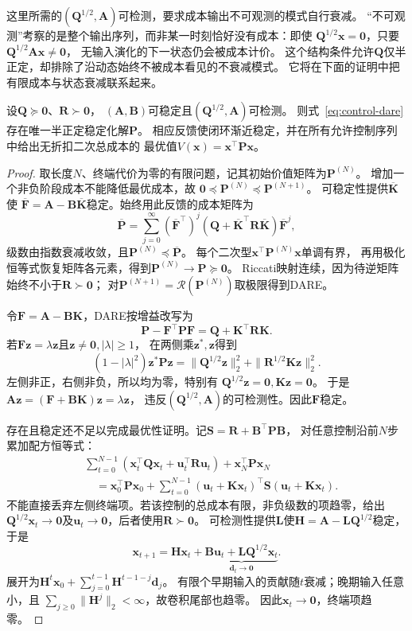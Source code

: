 这里所需的$(\bm Q^{1/2},\bm A)$可检测，要求成本输出不可观测的模式自行衰减。
“不可观测”考察的是整个输出序列，而非某一时刻恰好没有成本：即使
$\bm Q^{1/2}\bm x=\bm0$，只要$\bm Q^{1/2}\bm A\bm x\neq\bm0$，
无输入演化的下一状态仍会被成本计价。
这个结构条件允许$\bm Q$仅半正定，却排除了沿动态始终不被成本看见的不衰减模式。
它将在下面的证明中把有限成本与状态衰减联系起来。

\begin{theorem}[无限时域LQR的稳定化解]
\label{thm:control-infinite-horizon-lqr}
设$\bm Q\succeq\bm0$、$\bm R\succ\bm0$，
$(\bm A,\bm B)$可稳定且$(\bm Q^{1/2},\bm A)$可检测。
则式~\eqref{eq:control-dare}存在唯一半正定稳定化解$\bm P$。
相应反馈使闭环渐近稳定，并在所有允许控制序列中给出无折扣二次总成本的
最优值$V(\bm x)=\bm x^\top\bm P\bm x$。
\end{theorem}
\begin{proof}
取长度$N$、终端代价为零的有限问题，记其初始价值矩阵为$\bm P^{(N)}$。
增加一个非负阶段成本不能降低最优成本，故
$\bm0\preceq\bm P^{(N)}\preceq\bm P^{(N+1)}$。
可稳定性提供$\overline{\bm K}$使
$\overline{\bm F}=\bm A-\bm B\overline{\bm K}$稳定。始终用此反馈的成本矩阵为
\[
  \overline{\bm P}=\sum_{j=0}^\infty
  (\overline{\bm F}^\top)^j
  (\bm Q+\overline{\bm K}^\top\bm R\overline{\bm K})
  \overline{\bm F}^j,
\]
级数由指数衰减收敛，且$\bm P^{(N)}\preceq\overline{\bm P}$。
每个二次型$\bm x^\top\bm P^{(N)}\bm x$单调有界，
再用极化恒等式恢复矩阵各元素，得到$\bm P^{(N)}\to\bm P\succeq\bm0$。
Riccati映射连续，因为待逆矩阵始终不小于$\bm R\succ\bm0$；
对$\bm P^{(N+1)}=\mathcal R(\bm P^{(N)})$取极限得到DARE。

令$\bm F=\bm A-\bm B\bm K$，DARE按增益改写为
\begin{equation}
  \bm P-\bm F^\top\bm P\bm F=\bm Q+\bm K^\top\bm R\bm K.
  \label{eq:control-dare-lyapunov}
\end{equation}
若$\bm F\bm z=\lambda\bm z$且$\bm z\neq\bm0,|\lambda|\geq1$，
在两侧乘$\bm z^\ast,\bm z$得到
\[
  (1-|\lambda|^2)\bm z^\ast\bm P\bm z
  =\|\bm Q^{1/2}\bm z\|_2^2+\|\bm R^{1/2}\bm K\bm z\|_2^2.
\]
左侧非正，右侧非负，所以均为零，特别有
$\bm Q^{1/2}\bm z=\bm0,\bm K\bm z=\bm0$。
于是$\bm A\bm z=(\bm F+\bm B\bm K)\bm z=\lambda\bm z$，
违反$(\bm Q^{1/2},\bm A)$的可检测性。因此$\bm F$稳定。

存在且稳定还不足以完成最优性证明。记$\bm S=\bm R+\bm B^\top\bm P\bm B$，
对任意控制沿前$N$步累加配方恒等式：
\begin{align*}
  &\sum_{t=0}^{N-1}
    (\bm x_t^\top\bm Q\bm x_t+\bm u_t^\top\bm R\bm u_t)
    +\bm x_N^\top\bm P\bm x_N\\
  &\quad=\bm x_0^\top\bm P\bm x_0+
    \sum_{t=0}^{N-1}
    (\bm u_t+\bm K\bm x_t)^\top\bm S(\bm u_t+\bm K\bm x_t).
\end{align*}
不能直接丢弃左侧终端项。若该控制的总成本有限，非负级数的项趋零，给出
$\bm Q^{1/2}\bm x_t\to\bm0$及$\bm u_t\to\bm0$，后者使用$\bm R\succ\bm0$。
可检测性提供$\bm L$使$\bm H=\bm A-\bm L\bm Q^{1/2}$稳定，于是
\[
  \bm x_{t+1}=\bm H\bm x_t+
       \underbrace{\bm B\bm u_t+\bm L\bm Q^{1/2}\bm x_t}_{\bm d_t\to\bm0}.
\]
展开为$\bm H^t\bm x_0+\sum_{j=0}^{t-1}\bm H^{t-1-j}\bm d_j$。
有限个早期输入的贡献随$t$衰减；晚期输入任意小，且
$\sum_{j\geq0}\|\bm H^j\|_2<\infty$，故卷积尾部也趋零。
因此$\bm x_t\to\bm0$，终端项趋零。


\end{proof}

